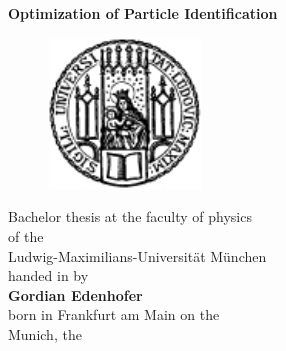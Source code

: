 \thispagestyle{empty}
\begin{center}
	\begin{LARGE}
		{
			\bf
			\hspace*{1cm} Optimization of Particle Identification \\ [0.3cm]
		}
	\end{LARGE}
	\vspace{0.5cm}
	\begin{figure}[htbp]
		\begin{center}
			\hspace*{1cm}
			\includegraphics[height=4cm]{pics/lmu3.pdf}
		\end{center}
	\end{figure}

	\vspace{1.0cm}
	\begin{large}
		\hspace*{1cm}Bachelor thesis at the faculty of physics \\
		\hspace*{1cm}of the \\
		\hspace*{1cm}Ludwig-Maximilians-Universität München \\ [2.5cm]
		\hspace*{1cm}handed in by \\
		{\bf
		\hspace*{1cm}Gordian Edenhofer \\ }
		\hspace*{1cm}born in Frankfurt am Main on the  \\ [0.5cm]
		\hspace*{1cm}Munich, the 
	\end{large}
\end{center}
